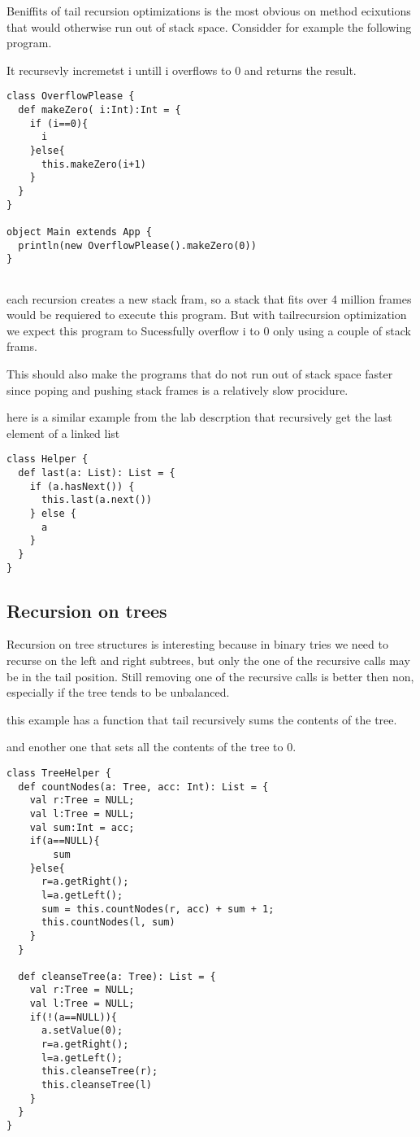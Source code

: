 Beniffits of tail recursion optimizations is the most obvious on method ecixutions that  would otherwise run out of stack space. Considder for example the following program.

It recursevly incremetst i untill i overflows to 0 and returns the result.
\begin{lstlisting}
class OverflowPlease {
  def makeZero( i:Int):Int = {
    if (i==0){
      i
    }else{
      this.makeZero(i+1)
    }
  }
}

object Main extends App {
  println(new OverflowPlease().makeZero(0))
}


\end{lstlisting}
each recursion creates a new stack fram, so a stack that fits over 4 million frames would be requiered to execute this program. But with tailrecursion optimization we expect this program to Sucessfully overflow i to 0 only using a couple of stack frams.

This should also make the programs that do not run out of stack space faster since poping and pushing stack frames is a relatively slow procidure.


here is a similar example from the lab descrption that recursively get the last element of a linked list

\begin{lstlisting}
class Helper {
  def last(a: List): List = {
    if (a.hasNext()) {
      this.last(a.next())
    } else {
      a
    }
  }
}
\end{lstlisting}

\subsection{Recursion on trees}

Recursion on tree structures is interesting because in binary tries we need to recurse on the left and right subtrees, but only the one of the recursive calls may be in the tail position. Still removing one of the recursive calls is better then non, especially if the tree tends to be unbalanced.

this example has a function that tail recursively sums the contents of the tree.

and enother one that sets all the contents of the tree to 0.

\begin{lstlisting}
class TreeHelper {
  def countNodes(a: Tree, acc: Int): List = {
    val r:Tree = NULL;
    val l:Tree = NULL;
    val sum:Int = acc;
    if(a==NULL){
        sum
    }else{
      r=a.getRight();
      l=a.getLeft();
      sum = this.countNodes(r, acc) + sum + 1;
      this.countNodes(l, sum)
    }
  }
  
  def cleanseTree(a: Tree): List = {
    val r:Tree = NULL;
    val l:Tree = NULL;
    if(!(a==NULL)){
      a.setValue(0);
      r=a.getRight();
      l=a.getLeft();
      this.cleanseTree(r);
      this.cleanseTree(l)
    }
  }
}
\end{lstlisting}

